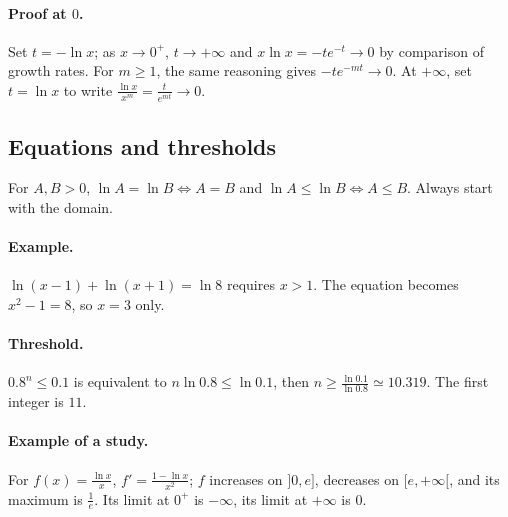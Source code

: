 \paragraph{Proof at $0$.} Set $t=-\ln x$; as $x\to0^+$, $t\to+\infty$ and $x\ln x=-te^{-t}\to0$ by comparison of growth rates. For $m\ge1$, the same reasoning gives $-te^{-mt}\to0$. At $+\infty$, set $t=\ln x$ to write $\frac{\ln x}{x^m}=\frac{t}{e^{mt}}\to0$.
\subsection{Equations and thresholds}
For $A,B>0$, $\ln A=\ln B\Leftrightarrow A=B$ and $\ln A\le\ln B\Leftrightarrow A\le B$. Always start with the domain.
\paragraph{Example.} $\ln(x-1)+\ln(x+1)=\ln8$ requires $x>1$. The equation becomes $x^2-1=8$, so $x=3$ only.
\paragraph{Threshold.} $\num{0,8}^n\le\num{0,1}$ is equivalent to $n\ln\num{0,8}\le\ln\num{0,1}$, then $n\ge\frac{\ln \num{0,1}}{\ln \num{0,8}}\simeq\num{10,319}$. The first integer is $11$.
\paragraph{Example of a study.} For $f(x)=\frac{\ln x}{x}$, $f'=\frac{1-\ln x}{x^2}$; $f$ increases on $]0,e]$, decreases on $[e,+\infty[$, and its maximum is $\frac{1}{e}$. Its limit at $0^+$ is $-\infty$, its limit at $+\infty$ is $0$.


\begin{center}\end{center}

\mxnewpage
